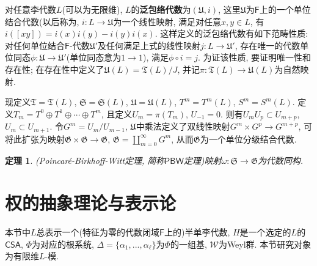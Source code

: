 \documentclass{ctexart}%
\newtheorem{theorem}{定理}
\theoremstyle{definition}
\theoremstyle{remark}
\begin{document}
对任意李代数$L$(可以为无限维), $L$的\textbf{泛包络代数}为$(\mathfrak{U},i)$, 这里$\mathfrak{U}$为$\mathsf{F}$上的一个单位结合代数(以后称为, $i\colon L\rightarrow\mathfrak{U}$为一个线性映射, 满足对任意$x,y\in L$, 有$i([xy])=i(x)i(y)-i(y)i(x)$. 这样定义的泛包络代数有如下范畴性质: 对任何单位结合$\mathsf{F}$-代数$\mathfrak{U}'$及任何满足上式的线性映射$j\colon L\rightarrow \mathfrak{U}'$, 存在唯一的代数单位同态$\phi\colon \mathfrak{U}\rightarrow \mathfrak{U}'$(单位同态意为$1\rightarrow 1$), 满足$\phi\circ i = j$. 为证该性质, 要证明唯一性和存在性; 在存在性中定义了$\mathfrak{U}(L)=\mathfrak{T}(L)/J$, 并记$\pi\colon \mathfrak{T}(L)\rightarrow \mathfrak{U}(L)$为自然映射. 

现定义$\mathfrak{T}=\mathfrak{T}(L)$, $\mathfrak{S}=\mathfrak{S}(L)$, $\mathfrak{U}=\mathfrak{U}(L)$, $T^m=T^m(L)$, $S^m=S^m(L)$. 定义$T_m=T^0\oplus T^1\oplus\cdots \oplus T^m$, 且定义$U_m=\pi(T_m)$, $U_{-1}=0$. 则有$U_mU_p\subset U_{m+p}$, $U_m\subset U_{m+1}$. 令$G^m=U_m/U_{m-1}$, $\mathfrak{U}$中乘法定义了双线性映射$G^m\times G^p\rightarrow G^{m+p}$, 可将此扩张为映射$\mathfrak{G}\times \mathfrak{G}\rightarrow \mathfrak{G}$, $\mathfrak{G} = \coprod_{m=0}^\infty G^m$, 从而$\mathfrak{G}$为一个单位分级结合代数.


\begin{theorem} (Poincar\'e-Birkhoff-Witt定理, 简称$\mathsf{PBW}$定理)映射$\omega\colon \mathfrak{S}\rightarrow \mathfrak{G}$为代数同构.
\end{theorem}


\section{权的抽象理论与表示论}

本节中$L$总表示一个(特征为零的代数闭域$\mathsf{F}$上的)半单李代数, $H$是一个选定的$L$的$\mathsf{CSA}$, $\Phi$为对应的根系统, $\Delta=\{\alpha_1,...,\alpha_\ell\}$为$\Phi$的一组基, $\mathscr{W}$为Weyl群. 本节研究对象为有限维$L$-模. 
\end{document}

